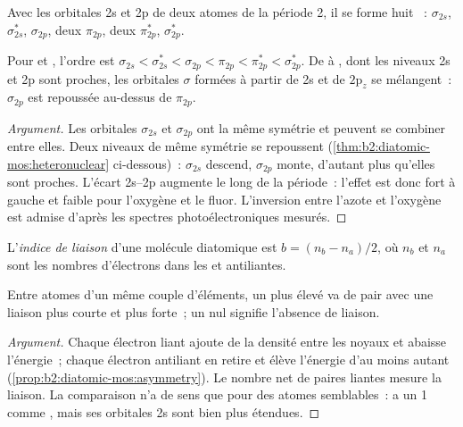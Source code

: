 Avec les orbitales 2s et 2p de deux atomes de la période 2, il se forme huit ~:
$\sigma_{2s}$, $\sigma^*_{2s}$, $\sigma_{2p}$, deux $\pi_{2p}$, deux $\pi^*_{2p}$,
$\sigma^*_{2p}$.

\begin{proposition}[Interaction s--p]\label{prop:b2:diatomic-mos:sp-mixing}
Pour  et , l'ordre est $\sigma_{2s} < \sigma^*_{2s} < \sigma_{2p} < \pi_{2p} <
\pi^*_{2p} < \sigma^*_{2p}$. De  à , dont les niveaux 2s et 2p sont proches,
les orbitales $\sigma$ formées à partir de 2s et de $2\mathrm p_z$ se mélangent~: $\sigma_{2p}$ est repoussée
au-dessus de $\pi_{2p}$.
\end{proposition}

\begin{proof}[Argument]
Les orbitales $\sigma_{2s}$ et $\sigma_{2p}$ ont la même symétrie et peuvent se combiner
entre elles. Deux niveaux de même symétrie se repoussent (\cref{thm:b2:diatomic-mos:heteronuclear}
ci-dessous)~: $\sigma_{2s}$ descend, $\sigma_{2p}$ monte, d'autant plus qu'elles sont proches. L'écart
2s--2p augmente le long de la période~: l'effet est donc fort à gauche et faible pour
l'oxygène et le fluor. L'inversion entre l'azote et l'oxygène est admise d'après les
spectres photoélectroniques mesurés.
\end{proof}

\begin{definition}\label{def:b2:diatomic-mos:bond-order}
L'\emph{indice de liaison} d'une molécule diatomique est $b = (n_b -
n_a)/2$, où $n_b$ et $n_a$ sont les nombres d'électrons dans les  et
antiliantes.
\end{definition}

\begin{proposition}\label{prop:b2:diatomic-mos:bond-order}
Entre atomes d'un même couple d'éléments, un  plus élevé va de pair avec une liaison
plus courte et plus forte~; un  nul signifie l'absence de liaison.
\end{proposition}

\begin{proof}[Argument]
Chaque électron liant ajoute de la densité entre les noyaux et abaisse l'énergie~;
chaque électron antiliant en retire et élève l'énergie d'au moins autant
(\cref{prop:b2:diatomic-mos:asymmetry}). Le nombre net de paires liantes mesure
la liaison. La comparaison n'a de sens que pour des atomes semblables~:  a un
 1 comme , mais ses orbitales 2s sont bien plus étendues.
\end{proof}

